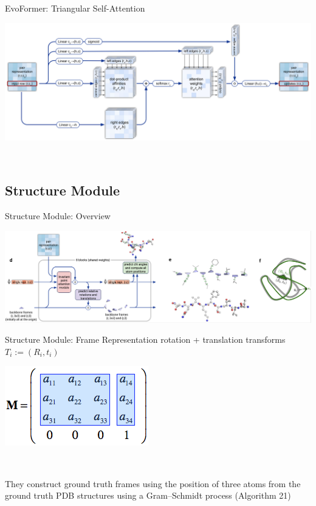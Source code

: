 \documentclass[presentation, smaller]{beamer}
\begin{document}
\begin{frame}[label={sec:org5511a29}]{EvoFormer: Triangular Self-Attention}
\begin{center}
\includegraphics[width=.9\linewidth]{./imgs/triangular-self-attention.png}
\end{center}~\cite{jumperHighlyAccurateProtein2021}
\end{frame}

\subsection*{Structure Module}
\label{sec:org3bb0df3}
\begin{frame}[label={sec:orgafc855d}]{Structure Module: Overview}
\begin{center}
\includegraphics[width=.9\linewidth]{./imgs/model-structure.png}
\end{center}
\cite{jumperHighlyAccurateProtein2021}
\end{frame}

\begin{frame}[label={sec:orgc94754a}]{Structure Module: Frame Representation}
rotation + translation transforms \(T_i := (R_i,t_i)\)
\begin{center}
\includegraphics[height=.7\textheight]{./imgs/TransformationMatrix1.png}
\end{center}~\cite{SpatialTransformationMatrices}

They construct ground truth frames using the position of three atoms from the ground truth PDB structures using a Gram–Schmidt process (Algorithm 21)  \cite{SpatialTransformationMatrices}
\end{frame}
\end{document}
